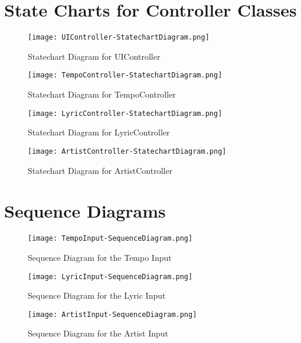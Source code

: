 \documentclass[]{article}
\begin{document}
\section{State Charts for Controller Classes}
\label{sec:state_charts_for_controller_classes}
\begin{figure}
	\centering
	\texttt{[image: UIController-StatechartDiagram.png]}
	\caption{Statechart Diagram for UIController}
	\label{fig:uicontroller_statechart}
\end{figure}
\begin{figure}
	\centering
	\texttt{[image: TempoController-StatechartDiagram.png]}
	\caption{Statechart Diagram for TempoController}
	\label{fig:uicontroller_statechart}
\end{figure}
\begin{figure}
	\centering
	\texttt{[image: LyricController-StatechartDiagram.png]}
	\caption{Statechart Diagram for LyricController}
	\label{fig:uicontroller_statechart}
\end{figure}
\begin{figure}
	\centering
	\texttt{[image: ArtistController-StatechartDiagram.png]}
	\caption{Statechart Diagram for ArtistController}
	\label{fig:uicontroller_statechart}
\end{figure}
\FloatBarrier

\section{Sequence Diagrams}
\label{sec:sequence_diagrams}
\begin{figure}
	\centering
	\texttt{[image: TempoInput-SequenceDiagram.png]}
	\caption{Sequence Diagram for the Tempo Input}
	\label{fig:tempo_input_sequence}
\end{figure}

\begin{figure}
	\centering
	\texttt{[image: LyricInput-SequenceDiagram.png]}
	\caption{Sequence Diagram for the Lyric Input}
	\label{fig:lyric_input_sequence}
\end{figure}

\begin{figure}
	\centering
	\texttt{[image: ArtistInput-SequenceDiagram.png]}
	\caption{Sequence Diagram for the Artist Input}
	\label{fig:artist_input_sequence}
\end{figure}
\FloatBarrier
\end{document}
